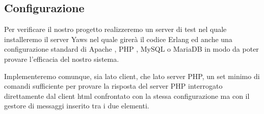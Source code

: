 \subsection{Configurazione}
Per verificare il nostro progetto realizzeremo un server di test nel quale installeremo il server Yaws nel quale girer\`a il codice Erlang ed anche una configurazione standard di Apache \cite{web:apache}, PHP \cite{web:php}, MySQL \cite{web:mysql} o MariaDB \cite{web:mariadb} in modo da poter provare l'efficacia del nostro sistema.

Implementeremo comunque, sia lato client, che lato server PHP, un set minimo di comandi sufficiente per provare la risposta del server PHP interrogato direttamente dal client html confrontato con la stessa configurazione ma con il gestore di messaggi inserito tra i due elementi.
